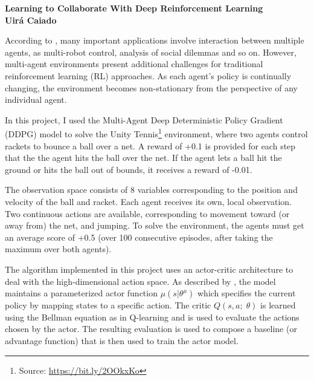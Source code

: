 \documentclass[a4paper]{article}
\begin{document}

\begin{center}

{\bf \large { Learning to Collaborate With Deep Reinforcement Learning \\ \small Uirá Caiado}}
\end{center}




According to \cite{NIPS2017_7217}, many important applications involve interaction between multiple agents, as multi-robot control,  analysis of social dilemmas and so on. However, multi-agent environments present additional challenges for traditional reinforcement learning (RL) approaches. As each agent's policy is continually changing, the environment becomes non-stationary from the perspective of any
individual agent.

 In this project, I used the Multi-Agent Deep Deterministic Policy Gradient (DDPG) model to solve the Unity Tennis\footnote{Source: \url{https://bit.ly/2OOkxKo}} environment, where two agents control rackets to bounce a ball over a net. A reward of +0.1 is provided for each step that the the agent hits the ball over the net. If the agent lets a ball hit the ground or hits the ball out of bounds, it receives a reward of -0.01.
 
 The observation space consists of 8 variables corresponding to the position and velocity of the ball and racket. Each agent receives its own, local observation.  Two continuous actions are available, corresponding to movement toward (or away from) the net, and jumping. To solve the environment, the agents must get an average score of +0.5 (over 100 consecutive episodes, after taking the maximum over both agents).


The algorithm implemented in this project uses an actor-critic architecture to deal with the high-dimensional action space. As described by \cite{Lillicrap:2015ww}, the model maintains a parameterized actor function $\mu(s | \theta^{\mu})$ which specifies the current policy by mapping states to a specific action. The critic $Q(s, a; \;\theta)$ is learned using the Bellman equation as in Q-learning and is used to evaluate the actions chosen by the actor. The resulting evaluation is used to compose a baseline (or advantage function) that is then used to train the actor model. 
 
\end{document}
